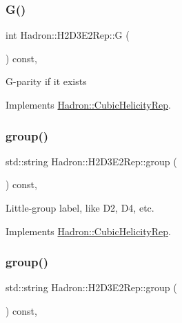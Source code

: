 \subsubsection{\texorpdfstring{G()}{G()}\hspace{0.1cm}{\footnotesize\ttfamily [3/3]}}
{\footnotesize\ttfamily int Hadron\+::\+H2\+D3\+E2\+Rep\+::G (\begin{DoxyParamCaption}{ }\end{DoxyParamCaption}) const\hspace{0.3cm}{\ttfamily [inline]}, {\ttfamily [virtual]}}

G-\/parity if it exists 

Implements \mbox{\hyperlink{structHadron_1_1CubicHelicityRep_a50689f42be1e6170aa8cf6ad0597018b}{Hadron\+::\+Cubic\+Helicity\+Rep}}.

\mbox{\label{structHadron_1_1H2D3E2Rep_a3a6d6bb478ae6e65c1d31ad244ab4d20}} 
\subsubsection{\texorpdfstring{group()}{group()}\hspace{0.1cm}{\footnotesize\ttfamily [1/5]}}
{\footnotesize\ttfamily std\+::string Hadron\+::\+H2\+D3\+E2\+Rep\+::group (\begin{DoxyParamCaption}{ }\end{DoxyParamCaption}) const\hspace{0.3cm}{\ttfamily [inline]}, {\ttfamily [virtual]}}

Little-\/group label, like D2, D4, etc. 

Implements \mbox{\hyperlink{structHadron_1_1CubicHelicityRep_a101a7d76cd8ccdad0f272db44b766113}{Hadron\+::\+Cubic\+Helicity\+Rep}}.

\mbox{\label{structHadron_1_1H2D3E2Rep_a3a6d6bb478ae6e65c1d31ad244ab4d20}} 
\subsubsection{\texorpdfstring{group()}{group()}\hspace{0.1cm}{\footnotesize\ttfamily [2/5]}}
{\footnotesize\ttfamily std\+::string Hadron\+::\+H2\+D3\+E2\+Rep\+::group (\begin{DoxyParamCaption}{ }\end{DoxyParamCaption}) const\hspace{0.3cm}{\ttfamily [inline]}, {\ttfamily [virtual]}}

